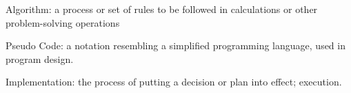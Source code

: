 \documentclass{beamer}
\begin{document}
\begin{frame}

\begin{definition}{Algorithm:}
a process or set of rules to be followed in calculations or other problem-solving operations
\end{definition}


\end{frame} \begin{frame}

\begin{definition}{Pseudo Code:}
a notation resembling a simplified programming language, used in program design.
\end{definition}

\end{frame} \begin{frame}

\begin{definition}{Implementation:}
the process of putting a decision or plan into effect; execution.
\end{definition}

\end{frame}
\end{document}
